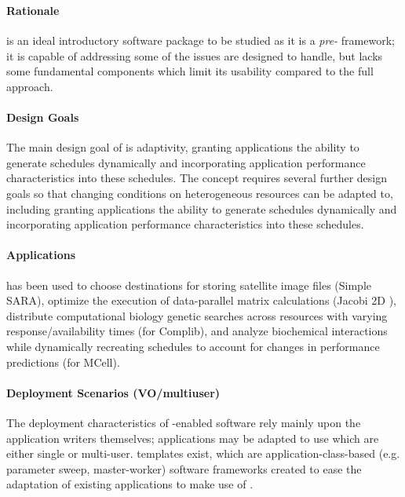 \documentclass{sig-alternate}
\begin{document}
%
\subsubsection{\apples}
\paragraph{Rationale}
\apples is an ideal introductory software package to be studied
as it is a \textit{pre-\pilot} framework; it is capable of
addressing some of the issues \pilotjobs are designed to handle,
but lacks some fundamental components which limit its usability
compared to the full \pilotjob approach.

\paragraph{Design Goals}
The main design goal of \apples is adaptivity, granting applications 
the ability to generate schedules dynamically and incorporating
application performance characteristics into these schedules.
The concept requires several further
design goals so that changing conditions on heterogeneous
resources can be adapted to, including granting applications
the ability to generate schedules dynamically and incorporating
application performance characteristics into these schedules.

\paragraph{Applications}
\apples has been used to choose destinations
for storing satellite image files (Simple SARA), 
optimize the execution of data-parallel matrix
calculations (Jacobi 2D \apples), 
distribute computational biology genetic searches
across resources with varying response/availability times 
(\apples for Complib), and
analyze biochemical interactions while dynamically recreating
schedules to account for changes in performance predictions
(\apples for MCell).

\paragraph{Deployment Scenarios (VO/multiuser)}
The deployment characteristics of \apples-enabled software rely
mainly upon the application writers themselves; applications
may be adapted to use \apples which are either single or multi-user.
\apples templates exist, which are application-class-based (e.g.
parameter sweep, master-worker) 
software frameworks created
to ease the adaptation of existing applications to make use
of \apples.
\end{document}
